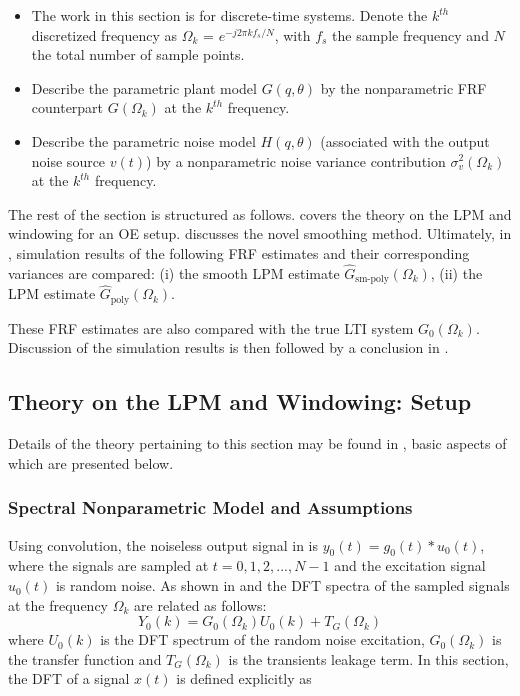 \begin{itemize}

\item The work in this section is for discrete-time systems. Denote the $k^{th}$ discretized frequency as $\Omega_k$ = $e^{-j2{\pi}kf_s/N}$, with $f_s$ the sample frequency and $N$ the total number of sample points.

\item  Describe the parametric plant model  $G(q,\theta)$ by the nonparametric \gls{FRF} counterpart  $G(\Omega_k)$  at the $k^{th}$ frequency.

\item Describe  the parametric noise model $H(q,\theta)$ (associated with the output noise source $v(t)$) by a nonparametric noise variance contribution $\sigma^2_v(\Omega_k)$ at the $k^{th}$ frequency.

\end{itemize}

The rest of the section is structured as follows. 
 covers the theory on the \gls{LPM} and windowing for an \gls{OE} setup.
 discusses the novel smoothing method.
Ultimately, in , simulation results of the following FRF estimates and their corresponding variances are compared: (i) the smooth \gls{LPM} estimate $\hat{G}_\text{sm-poly}(\Omega_k)$, (ii) the \gls{LPM} estimate $\hat{G}_\text{poly}(\Omega_k)$.

These FRF estimates are also compared with the true \gls{LTI} system ${G}_0(\Omega_k)$.
Discussion of the simulation results is then followed by a conclusion in .

\subsection{Theory on the LPM and Windowing:  Setup}
\label{se:theoryLPMandWindowing}

Details of the theory pertaining to this section may be found in \citep{Schoukens2009LPM}, basic aspects of which are presented below.


\subsubsection{Spectral Nonparametric Model and Assumptions}

Using convolution, the noiseless output signal in  is $y_0(t) = g_0(t)*u_0(t)$, where the signals are sampled at $t = 0, 1, 2,...,N-1$ and the excitation signal $u_0(t)$ is random noise. As shown in \citep{Pintelon2012} and \citep{Pintelon1997} the \gls{DFT} spectra of the sampled signals at the frequency $\Omega_k$ are related as follows:
\begin{equation}\label{eq:nparam:trunc:LPM:leakage}
Y_0(k)=G_0(\Omega_k)U_0(k)+T_G(\Omega_k)
\end{equation}
where $U_0(k)$ is the \gls{DFT} spectrum of the random noise excitation,  $G_0(\Omega_k)$ is the transfer function and $T_G(\Omega_k)$ is the transients leakage term.
In this section, the \gls{DFT} of a signal $x(t)$ is defined explicitly as  \citep{Oppenheim1983}

